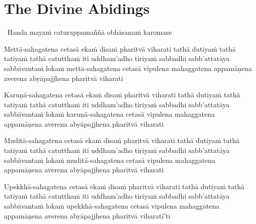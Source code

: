 \suttaRef{[AN 3.65 \& AN 5.57]}

\ifdigital{}\fi



\section{The Divine Abidings}
\label{divine-abidings}

\begin{leader}
  \anglebracketleft\ \hspace{-0.5mm}Handa mayaṁ caturappamaññā obhāsanaṁ karomase \hspace{-0.5mm}\anglebracketright\
\end{leader}

\begin{pali-hang}
  Mettā-sahagatena cetasā ekaṁ disaṁ pharitvā viharati tathā dutiyaṁ tathā tatiyaṁ tathā catutthaṁ iti uddham'adho tiriyaṁ sabbadhi sabb'attatāya sabbāvantaṁ lokaṁ mettā-sahagatena cetasā vipulena mahaggatena appamāṇena averena abyāpajjhena pharitvā viharati
\end{pali-hang}

\medskip

\begin{pali-hang}
  Karuṇā-sahagatena cetasā ekaṁ disaṁ pharitvā viharati tathā dutiyaṁ tathā tatiyaṁ tathā catutthaṁ iti uddham'adho tiriyaṁ sabbadhi sabb'attatāya sabbāvantaṁ lokaṁ karuṇā-sahagatena cetasā vipulena mahaggatena appamāṇena averena abyāpajjhena pharitvā viharati
\end{pali-hang}

\medskip

\ifninebythirteen\clearpage\fi

\begin{pali-hang}
  Muditā-sahagatena cetasā ekaṁ disaṁ pharitvā viharati tathā dutiyaṁ tathā tatiyaṁ tathā catutthaṁ iti uddham'adho tiriyaṁ sabbadhi sabb'attatāya sabbāvantaṁ lokaṁ muditā-sahagatena cetasā vipulena mahaggatena appamāṇena averena abyāpajjhena pharitvā viharati
\end{pali-hang}

\medskip

\begin{pali-hang}
  Upekkhā-sahagatena cetasā ekaṁ disaṁ pharitvā viharati tathā dutiyaṁ tathā tatiyaṁ tathā catutthaṁ iti uddham'adho tiriyaṁ sabbadhi sabb'attatāya sabbāvantaṁ lokaṁ upekkhā-sahagatena cetasā vipulena mahaggatena appamāṇena averena abyāpajjhena pharitvā viharatī'ti
\end{pali-hang}

